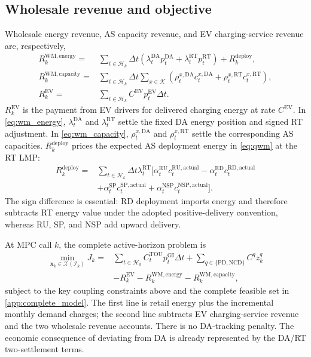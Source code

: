 \documentclass[final,5p,times]{elsarticle}
\newcommand{\dt}{\Delta t}
\newcommand{\EV}{\mathrm{EV}}
\newcommand{\DA}{\mathrm{DA}}
\newcommand{\RT}{\mathrm{RT}}
\newcommand{\GI}{\mathrm{GI}}
\newcommand{\TOU}{\mathrm{TOU}}
\newcommand{\PD}{\mathrm{PD}}
\newcommand{\NCD}{\mathrm{NCD}}
\newcommand{\RU}{\mathrm{RU}}
\newcommand{\RD}{\mathrm{RD}}
\newcommand{\SP}{\mathrm{SP}}
\newcommand{\NSP}{\mathrm{NSP}}
\newcommand{\WM}{\mathrm{WM}}
\newcommand{\actual}{\mathrm{actual}}
\newcommand{\calH}{\mathcal{H}}
\newcommand{\calK}{\mathcal{K}}
\begin{document}
\subsection{Wholesale revenue and objective}
Wholesale energy revenue, AS capacity revenue, and EV charging-service revenue
are, respectively,
\begin{align}
R_k^{\WM,\mathrm{energy}}
={}&\sum_{t\in\calH_k}\dt
\left(\lambda_t^{\DA}p_t^{\DA}
+\lambda_t^{\RT}p_t^{\RT}\right)+R_k^{\mathrm{deploy}}, \label{eq:wm_energy}\\
R_k^{\WM,\mathrm{capacity}}
={}&\sum_{t\in\calH_k}\dt\sum_{x\in\calK}
\left(\rho_t^{x,\DA}c_t^{x,\DA}
+\rho_t^{x,\RT}c_t^{x,\RT}\right), \label{eq:wm_capacity}\\
R_k^{\EV}
={}&\sum_{t\in\calH_k}C^{\EV}p_t^{\EV}\dt. \label{eq:ev_revenue}
\end{align}
$R_k^{\EV}$ is the payment from EV drivers for delivered charging energy at rate $C^{\EV}$. In \eqref{eq:wm_energy}, $\lambda_t^{\DA}$ and $\lambda_t^{\RT}$ settle the fixed
DA energy position and signed RT adjustment. In \eqref{eq:wm_capacity}, $\rho_t^{x,\DA}$ and $\rho_t^{x,\RT}$ settle the corresponding AS capacities. $R_k^{\mathrm{deploy}}$ prices the expected AS deployment energy in
\eqref{eq:qwm} at the RT LMP:
\begin{align}
R_k^{\mathrm{deploy}}
={}&\sum_{t\in\calH_k}\dt\lambda_t^{\RT}
\bigg[\alpha_t^{\RU}c_t^{\RU,\actual}
-\alpha_t^{\RD}c_t^{\RD,\actual}\nonumber\\
&+\alpha_t^{\SP}c_t^{\SP,\actual}
+\alpha_t^{\NSP}c_t^{\NSP,\actual}\bigg].
\label{eq:wm_deployment_revenue}
\end{align}
The sign difference is essential: RD deployment imports energy and therefore
subtracts RT energy value under the adopted positive-delivery convention,
whereas RU, SP, and NSP add upward delivery.

At MPC call $k$, the complete active-horizon problem is
\begin{align}
\min_{\boldsymbol{x}_k\in\mathcal{X}(\mathcal{I}_k)}
J_k={}&
\sum_{t\in\calH_k}C_t^{\TOU}p_t^{\GI}\dt
+\sum_{q\in\{\PD,\NCD\}}C^qz_k^q \nonumber\\
&-R_k^{\EV}
-R_k^{\WM,\mathrm{energy}}
-R_k^{\WM,\mathrm{capacity}}, \label{eq:objective}
\end{align}
subject to the key coupling constraints above and the complete feasible set in \ref{app:complete_model}. The first line is retail energy plus the incremental monthly demand charges; the second line subtracts EV charging-service revenue and the two wholesale revenue accounts. There is no DA-tracking penalty. The economic consequence of deviating from DA is already represented by the DA/RT two-settlement terms.
\end{document}
